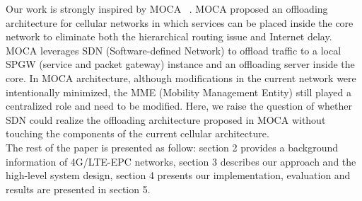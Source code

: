 Our work is strongly inspired by MOCA ~\cite{banerjee2013moca}. 
MOCA proposed an offloading architecture for cellular networks in which 
services can be placed inside the core network to eliminate both the hierarchical routing issue 
and Internet delay. MOCA leverages SDN (Software-defined Network) to offload traffic 
to a local SPGW (service and packet gateway) instance and an offloading server inside the core.  
In MOCA architecture, although modifications in the current network were intentionally minimized, 
the MME (Mobility Management Entity) still played a centralized role and need to be modified. 
Here, we raise the question of whether SDN could realize the offloading architecture 
proposed in MOCA without touching the components of the current cellular architecture.\\

The rest of the paper is presented as follow: section 2 provides a background information 
of 4G/LTE-EPC networks, section 3 describes our approach and the high-level system design, 
section 4 presents our implementation, evaluation and results are presented in section 5.\\





